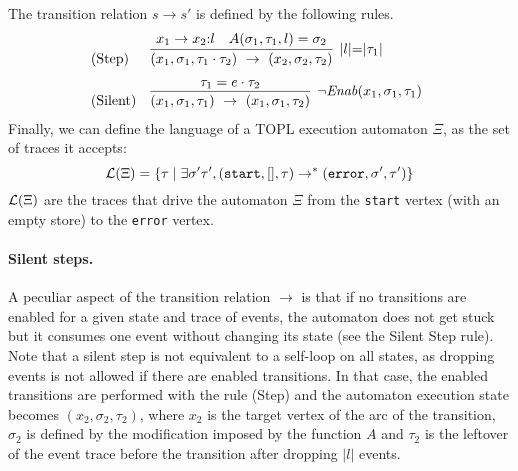\documentclass[9pt, preprint]{sigplanconf} %
\theoremstyle{definition}
\theoremstyle{remark}
\begin{document}
The transition relation $s \to s'$ is defined by the following rules.
\[
\begin{array}{ll}
\!\!\!\text{(Step)}  &
\infer[|l|{=}|\tau_1| ]{ (x_1,\sigma_1,\tau_1 \cdot \tau_2 ) \  \to \  (x_2, \sigma_2, \tau_2)}{x_1 \to x_2{:} l \quad A(\sigma_1,\tau_1,l)=\sigma_2}
\\[2ex]
\!\!\!\text{(Silent)}  &
\infer[\neg \Enabled(x_1,\sigma_1,\tau_1) ]{ (x_1,\sigma_1,\tau_1) \  \to \  (x_1, \sigma_1, \tau_2)}{ \tau_1=e \cdot \tau_2}
\end{array}
\]
Finally, we can define the language of a TOPL execution automaton $\Xi$, as the set of traces it accepts:
\[
{\cal L}(\Xi) = \{ \tau \mid \exists \sigma' \tau', (\mathtt{start},[],\tau) \to^* (\mathtt{error},\sigma',\tau')\}
\]
${\cal L}(\Xi)$ are the traces that drive the automaton $\Xi$ from the \texttt{start} vertex (with an empty store) to the \texttt{error} vertex.

\paragraph{Silent steps.}
A peculiar aspect of the transition relation $\to$ is that if no transitions are enabled for a given state and trace of events, the automaton does not get stuck but it consumes one event without changing its state (see the  Silent Step rule).
Note that a silent step is not equivalent to a self-loop on all states, as dropping events is not allowed if there are enabled transitions.
In that case,  the enabled transitions are performed with the rule (Step) and the automaton execution state becomes $(x_2, \sigma_2,\tau_2)$, where $x_2$ is the target vertex of the arc of the transition, $\sigma_2$ is defined by the modification imposed by the function $A$ and $\tau_2$ is the leftover of the event trace before the transition after dropping $|l|$ events.
\end{document}
